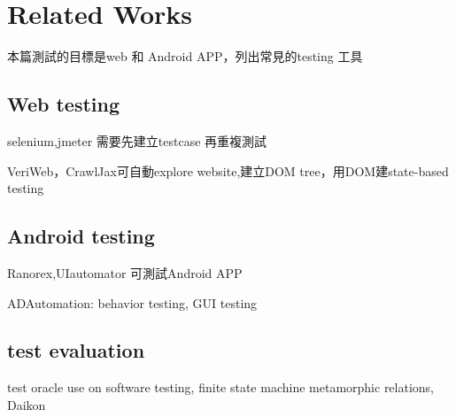 
\chapter{Related Works}\label{ch:related}

本篇測試的目標是web 和 Android APP，列出常見的testing 工具

\section{Web testing}

selenium,jmeter 需要先建立testcase 再重複測試

VeriWeb，CrawlJax可自動explore website,建立DOM tree，用DOM建state-based testing

\section{Android testing}

Ranorex,UIautomator 可測試Android APP

ADAutomation: behavior testing, GUI testing

\section{test evaluation}

test oracle use on software testing, finite state machine
metamorphic relations, 
Daikon
